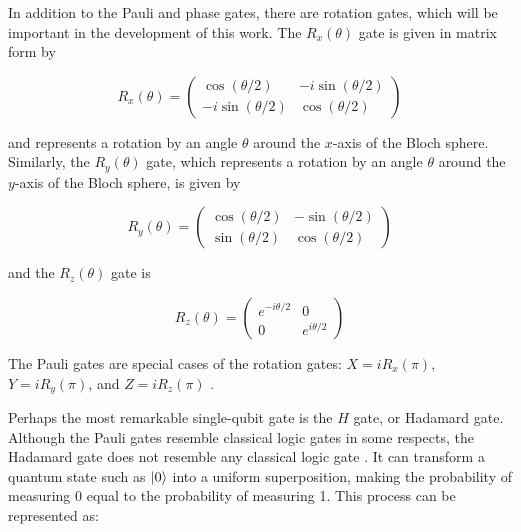 In addition to the Pauli and phase gates, there are rotation gates, which will be important in the development of this work. The $R_x(\theta)$ gate is given in matrix form by

\begin{center}
\begin{equation}
R_x(\theta) =
\begin{pmatrix}
\cos(\theta/2) & -i\sin(\theta/2) \\
-i\sin(\theta/2) & \cos(\theta/2)
\end{pmatrix}
\end{equation}
\end{center}

\noindent and represents a rotation by an angle $\theta$ around the $x$-axis of the Bloch sphere. Similarly, the $R_y(\theta)$ gate, which represents a rotation by an angle $\theta$ around the $y$-axis of the Bloch sphere, is given by

\begin{center}
\begin{equation}
R_y(\theta) =
\begin{pmatrix}
\cos(\theta/2) & -\sin(\theta/2) \\
\sin(\theta/2) & \cos(\theta/2)
\end{pmatrix}
\end{equation}
\end{center}

\noindent and the $R_z(\theta)$ gate is

\begin{center}
\begin{equation}
R_z(\theta) =
\begin{pmatrix}
e^{-i\theta/2} & 0            \\
0              & e^{i\theta/2}
\end{pmatrix}
\end{equation}
\end{center}

\noindent The Pauli gates are special cases of the rotation gates: $X=iR_x(\pi)$, $Y=iR_y(\pi)$, and $Z=iR_z(\pi)$ \cite{Zubairy2020}.

Perhaps the most remarkable single-qubit gate is the $H$ gate, or Hadamard gate. Although the Pauli gates resemble classical logic gates in some respects, the Hadamard gate does not resemble any classical logic gate \cite{Mermin2007QComputerScience}. It can transform a quantum state such as $\ket{0}$ into a uniform superposition, making the probability of measuring 0 equal to the probability of measuring 1. This process can be represented as:

